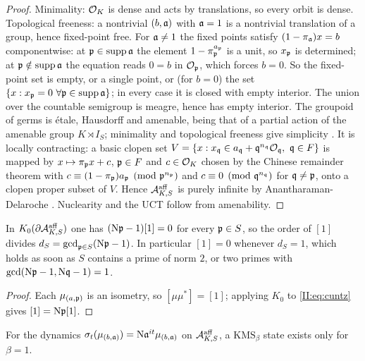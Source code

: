\begin{proof}
Minimality: $\mathcal{O}_K$ is dense and acts by translations, so every orbit is dense.
Topological freeness: a nontrivial $(b,\mathfrak{a})$ with $\mathfrak{a}=1$ is a nontrivial translation of a
group, hence fixed-point free. For $\mathfrak{a}\ne1$ the fixed points satisfy $(1-\pi_{\mathfrak{a}})x=b$
componentwise: at $\mathfrak{p}\in\operatorname{supp}\mathfrak{a}$ the element $1-\pi_{\mathfrak{p}}^{a_{\mathfrak{p}}}$ is a unit,
so $x_{\mathfrak{p}}$ is determined; at $\mathfrak{p}\notin\operatorname{supp}\mathfrak{a}$ the equation reads $0=b$ in
$\mathcal{O}_{\mathfrak{p}}$, which forces $b=0$. So the fixed-point set is empty, or a single point, or (for
$b=0$) the set $\{x:x_\pp=0\ \forall\pp\in\operatorname{supp}\aaa\}$; in every case it is closed
with empty interior. The union over the countable semigroup is meagre, hence has empty
interior. The groupoid of germs is \'etale, Hausdorff and amenable, being that of a partial
action of the amenable group $K\rtimes I_S$; minimality and topological freeness give
simplicity \cite{BCFS}. It is locally contracting: a basic clopen set
$V=\{x:x_{\mathfrak{q}}\in a_{\mathfrak{q}}+\mathfrak{q}^{n_{\mathfrak{q}}}\mathcal{O}_{\mathfrak{q}},\ \mathfrak{q}\in F\}$ is mapped by $x\mapsto\pi_{\mathfrak{p}} x+c$,
$\mathfrak{p}\in F$ and $c\in\mathcal{O}_K$ chosen by the Chinese remainder theorem with
$c\equiv(1-\pi_{\mathfrak{p}})a_{\mathfrak{p}}\pmod{\mathfrak{p}^{n_{\mathfrak{p}}}}$ and $c\equiv0\pmod{\mathfrak{q}^{n_{\mathfrak{q}}}}$ for $\mathfrak{q}\ne\mathfrak{p}$,
onto a clopen proper subset of $V$. Hence $\mathcal{A}^{\mathrm{aff}}_{K,S}$ is purely infinite by
Anantharaman-Delaroche \cite{AD}. Nuclearity and the UCT follow from amenability.
\end{proof}

\begin{theorem}\label{II:thm:unit}
In $K_0(\partial\mathcal{A}^{\mathrm{aff}}_{K,S})$ one has $(\mathrm{N}\mathfrak{p}-1)[1]=0$ for every $\mathfrak{p}\in S$,
so the order of $[1]$ divides $d_S=\gcd_{\mathfrak{p}\in S}(\mathrm{N}\mathfrak{p}-1)$. In particular $[1]=0$ whenever
$d_S=1$, which holds as soon as $S$ contains a prime of norm $2$, or two primes with
$\gcd(\mathrm{N}\mathfrak{p}-1,\mathrm{N}\mathfrak{q}-1)=1$.
\end{theorem}

\begin{proof}
Each $\mu_{(a,\mathfrak{p})}$ is an isometry, so $[\mu\mu^*]=[1]$; applying $K_0$ to \eqref{II:eq:cuntz}
gives $[1]=\mathrm{N}\mathfrak{p}[1]$.
\end{proof}

\begin{proposition}\label{II:prop:betaone}
For the dynamics $\sigma_t(\mu_{(b,\mathfrak{a})})=\mathrm{N}\mathfrak{a}^{it}\mu_{(b,\mathfrak{a})}$ on
$\mathcal{A}^{\mathrm{aff}}_{K,S}$, a $\mathrm{KMS}_\beta$ state exists only for $\beta=1$.
\end{proposition}

